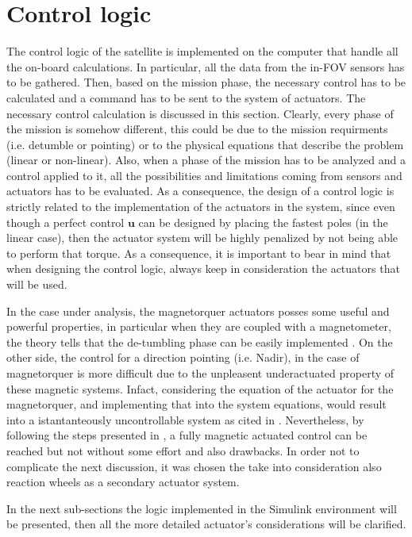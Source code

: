 \section{Control logic}
\label{sec:control_logic}
The control logic of the satellite is implemented on the computer that handle all the on-board calculations. In particular, all the data from the in-FOV sensors has to be 
gathered. Then, based on the mission phase, the necessary control has to be calculated and a command has to be sent to the system of actuators. The necessary control calculation is 
discussed in this section. Clearly, every phase of the mission is somehow different, this could be due to the mission requirments (i.e. detumble or pointing) or to the physical 
equations that describe the problem (linear or non-linear). Also, when a phase of the mission has to be analyzed and a control applied to it, all the possibilities and limitations 
coming from sensors and actuators has to be evaluated. As a consequence, the design of a control logic is strictly related to the implementation of the actuators in the system, since
even though a perfect control $\boldsymbol{u}$ can be designed by placing the fastest poles (in the linear case), then the actuator system will be highly penalized by not being able 
to perform that torque. As a consequence, it is important to bear in mind that when designing the control logic, always keep in consideration the actuators that will be used. 

In the case under analysis, the magnetorquer actuators posses some useful and powerful properties, in particular when they are coupled with a magnetometer, the theory tells that
the de-tumbling phase can be easily implemented \cite{bdot}. On the other side, the control for a direction pointing (i.e. Nadir), in the case of magnetorquer is more difficult due to the unpleasent
underactuated property of these magnetic systems. Infact, considering the equation of the actuator for the magnetorquer, and implementing that into the system equations, would result into a istantanteously
uncontrollable system as cited in \cite{lovera}. Nevertheless, by following the steps presented in \cite{lovera}, a fully magnetic actuated control can be reached but not without some 
effort and also drawbacks. In order not to complicate the next discussion, it was chosen the take into consideration also reaction wheels as a secondary actuator system.

In the next sub-sections the logic implemented in the Simulink environment will be presented, then all the more detailed actuator's considerations will be clarified. 
